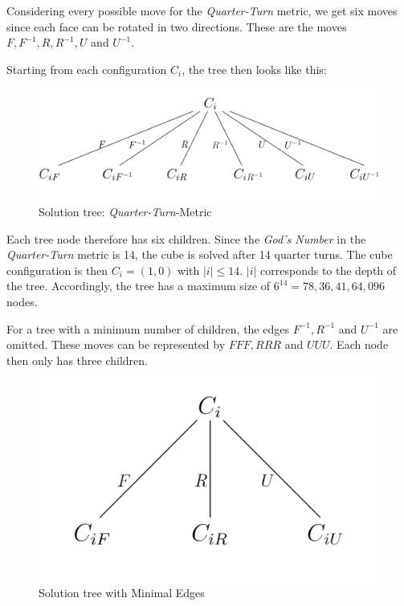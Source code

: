 \documentclass[12pt,a4paper]{article}
\theoremstyle{custom}
\begin{document}
Considering every possible move for the \textit{Quarter-Turn} metric, we get six moves since each face can be rotated in two directions. These are the moves $F, F^{-1}, R, R^{-1}, U$ and $U^{-1}$.

Starting from each configuration $C_i$, the tree then looks like this: \nopagebreak

\begin{figure}[H]
\centering
\includegraphics[scale=1.8]{Tree_1.jpg}
\caption{Solution tree: \textit{Quarter-Turn}-Metric}
\label{Figure_TreeQTM}
\end{figure}
Each tree node therefore has six children. Since the \textit{God's Number} in the \textit{Quarter-Turn} metric is 14, the cube is solved after 14 quarter turns. The cube configuration is then $C_i = (1, 0)$ with $|i| \leq 14$. $|i|$ corresponds to the depth of the tree. Accordingly, the tree has a maximum size of $6^{14} = 78, 36,41,64, 096$ nodes.

For a tree with a minimum number of children, the edges $F^{-1}, R^{-1}$ and $U^{-1}$ are omitted. These moves can be represented by $FFF, RRR$ and $UUU$. Each node then only has three children.

\begin{figure}[H]
\centering
\includegraphics[scale=0.75]{Tree_2.jpg}
\caption{Solution tree with Minimal Edges}
\label{Figure_TreeMin}
\end{figure}
\end{document}

